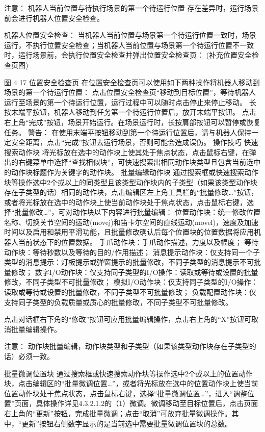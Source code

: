  	注意：
机器人当前位置与待执行场景的第一个待运行位置 存在差异时，运行场景前会进行机器人位置安全检查。

机器人位置安全检查：
当机器人当前位置与场景第一个待运行位置一致时，场景运行，不执行位置安全检查；当机器人当前位置与场景第一个待运行位置不一致时，运行场景前，会执行位置安全检查并弹出位置安全检查页：
(补充位置安全检查页图)

图 4 17 位置安全检查页
在位置安全检查页可以使用如下两种操作将机器人移动到场景的第一个待运行位置：
点击位置安全检查页“移动到目标位置”，等待机器人运行至场景的第一个待运行位置，运行过程中可以随时点击停止来停止移动。
长按末端平按钮，机器人移动到任务第一个待运行位置后，放开末端平按钮。
点击右上角“完成”按钮，场景开始运行。在场景运行时，长按肩部按钮可以暂停或恢复任务。
 	警告：
在使用末端平按钮移动到第一个待运行位置后，请与机器人保持一定安全距离，点击“完成”按钮去运行场景，否则可能会造成误伤。
操作技巧
快速搜索动作块
将光标放在选中的动作块上使其处于焦点状态，点击鼠标右键，在弹出的右键菜单中选择“查找相似块”，可快速搜索出相同动作块类型且包含当前选中的动作块标题作为关键字的动作块。
批量编辑动作块
通过搜索框或快速搜索动作块等操作选中2个或以上的同类型且该类型动作块内的子类型（如果该类型动作块存在子类型的话）相同的动作块，点击编辑区左上角工具栏的“批量修改…”按钮，或者将光标放在选中的动作块上使当前动作块处于焦点状态，点击鼠标右键，选择“批量修改…”，可对动作块以下内容进行批量编辑：
位置动作块：统一修改位置名称、切换关节空间的运动(movej)和笛卡尔空间的直线运动(movel)，速度及加速时间以及启用和禁用平滑功能，且批量修改确认后每个位置块的位置数据将应用机器人当前状态下的位置数据。
手爪动作块：手爪动作描述，力度以及幅度；
等待动作块：等待秒数以及等待的目的/作用描述；
消息提示动作块：仅支持同一个子类型的消息提示：灯板提示或弹窗提示的批量修改，不同子类型的消息提示不可批量修改；
	数字I/O动作块：仅支持同子类型的I/O操作：读取或等待或设置的批量修改，不同子类型不可批量修改；
	模拟I/O动作块：仅支持同子类型的I/O操作：读取或等待或设置的批量修改，不同子类型不可批量修改；
	负载配置动作块：仅支持同子类型的负载质量或质心的批量修改，不同子类型不可批量修改。

点击对话框右下角的“修改”按钮可应用批量编辑操作，点击右上角的“X”按钮可取消批量编辑操作。

 	注意：
动作块批量编辑，动作块类型和子类型（如果该类型动作块存在子类型的话）必须一致。


批量微调位置块
通过搜索框或快速搜索动作块等操作选中2个或以上的位置动作块，点击编辑区的“批量微调位置…”，或者将光标放在选中的位置动作块上使当前位置动作块处于焦点状态，点击鼠标右键，选择“批量微调位置…”，进入“调整位置”页面，具体操作详见4.3.2.1.2的（1）微调。微调移动至目标位置后，点击页面右上角的“更新”按钮，完成批量微调；点击“取消”可放弃批量微调操作。其中，“更新”按钮右侧数字显示的是当前选中需要批量微调位置块的总数。

